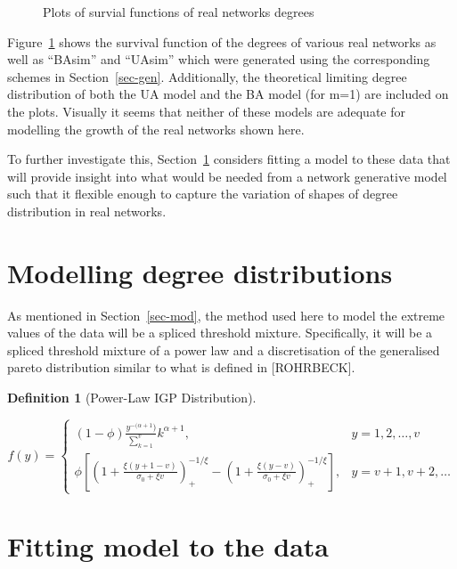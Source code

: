 \documentclass[
  10pt,
  a4paper,
]{scrreprt}
\theoremstyle{plain}
\theoremstyle{plain}
\theoremstyle{definition}
\newtheorem{definition}{Definition}[section]
\theoremstyle{plain}
\theoremstyle{remark}
\begin{document}
{\begin{figure}[H]
{}

\caption{\label{fig-survs}Plots of survial functions of real networks
degrees}

\end{figure}

Figure~\ref{fig-survs} shows the survival function of the degrees of
various real networks as well as ``BAsim'' and ``UAsim'' which were
generated using the corresponding schemes in Section~\ref{sec-gen}.
Additionally, the theoretical limiting degree distribution of both the
UA model and the BA model (for m=1) are included on the plots. Visually
it seems that neither of these models are adequate for modelling the
growth of the real networks shown here.

To further investigate this, Section~\ref{sec-realmodel} considers
fitting a model to these data that will provide insight into what would
be needed from a network generative model such that it flexible enough
to capture the variation of shapes of degree distribution in real
networks.

\hypertarget{sec-realmodel}{%
\section{Modelling degree distributions}\label{sec-realmodel}}

As mentioned in Section~\ref{sec-mod}, the method used here to model the
extreme values of the data will be a spliced threshold mixture.
Specifically, it will be a spliced threshold mixture of a power law and
a discretisation of the generalised pareto distribution similar to what
is defined in {[}ROHRBECK{]}.

\begin{definition}[Power-Law IGP
Distribution]\protect\hypertarget{def-pligp}{}\label{def-pligp}

\[
f(y) = \begin{cases}
(1-\phi)\displaystyle\frac{y^{-(\alpha+1})}{\sum_{k=1}^v}k^{\alpha+1}, & y=1,2,\ldots, v\\
\phi\left[\left(1+\displaystyle\frac{\xi(y+1-v)}{\sigma_0+\xi v}\right)_+^{-1/\xi}-\left(1+\displaystyle\frac{\xi(y-v)}{\sigma_0+\xi v}\right)_+^{-1/\xi}\right],&y=v+1, v+2,\ldots
\end{cases}
\]

\end{definition}

\hypertarget{fitting-model-to-the-data}{%
\section{Fitting model to the data}\label{fitting-model-to-the-data}}

}
\end{document}
